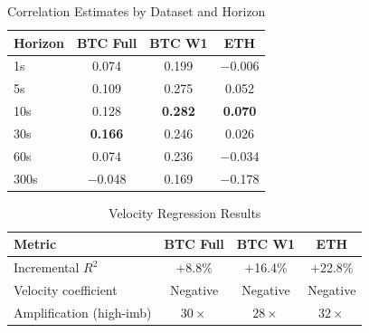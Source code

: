 \documentclass[12pt,a4paper]{article}
\begin{document}
\begin{appendices}
\begin{table}[H]
\centering
\caption{Correlation Estimates by Dataset and Horizon}
\label{tab:corr}
\begin{tabular}{lccc}
\toprule
\textbf{Horizon} & \textbf{BTC Full} & \textbf{BTC W1} & \textbf{ETH} \\
\midrule
1s  & 0.074 & 0.199 & $-$0.006 \\
5s  & 0.109 & 0.275 & 0.052 \\
10s & 0.128 & \textbf{0.282} & \textbf{0.070} \\
30s & \textbf{0.166} & 0.246 & 0.026 \\
60s & 0.074 & 0.236 & $-$0.034 \\
300s & $-$0.048 & 0.169 & $-$0.178 \\
\bottomrule
\end{tabular}
\end{table}

\begin{table}[H]
\centering
\caption{Velocity Regression Results}
\label{tab:velocity}
\begin{tabular}{lccc}
\toprule
\textbf{Metric} & \textbf{BTC Full} & \textbf{BTC W1} & \textbf{ETH} \\
\midrule
 Incremental $R^2$ & $+$8.8\% & $+$16.4\% & $+$22.8\% \\
 Velocity coefficient & Negative & Negative & Negative \\
 Amplification (high-imb) & $30\times$ & $28\times$ & $32\times$ \\
\bottomrule
\end{tabular}
\end{table}

\end{appendices}
\end{document}
